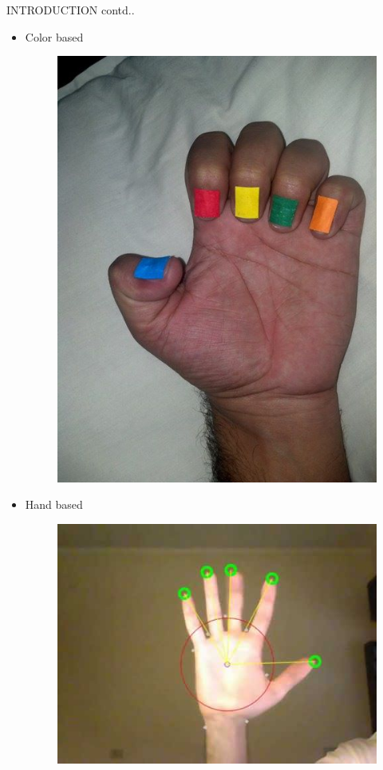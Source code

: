 \documentclass{beamer}
\begin{document}
\begin{frame}{INTRODUCTION contd..}
\begin{itemize}
\item Color based
\begin{figure}
\begin{center}
\includegraphics[scale=0.12]{images/colourhand.jpg}
\end{center}
\end{figure}
\vspace{.5 cm}
\item Hand based
\begin{figure}
\begin{center}
\includegraphics[scale=0.15]{images/plain.jpg}

\end{center}
\end{figure}
\end{itemize}
\end{frame}
\end{document}
